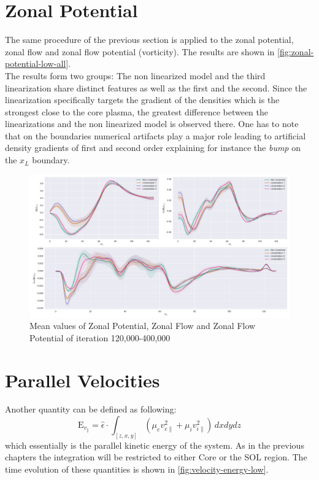 \documentclass[master.tex]{subfiles}
\begin{document}
\section{Zonal Potential}

The same procedure of the previous section is applied to the zonal potential, zonal flow and zonal flow potential (vorticity). The results are shown in \autoref{fig:zonal-potential-low-all}.\\
The results form two groups: The non linearized model and the third linearization share distinct features as well as the first and the second. Since the linearization specifically targets the gradient of the densities which is the strongest close to the core plasma, the greatest difference between the linearizations and the non linearized model is observed there. One has to note that on the boundaries numerical artifacts play a major role leading to artificial density gradients of first and second order explaining for instance the \textit{bump} on the $x_L$ boundary.

\begin{figure}[!htbp]
    \includegraphics[width=\linewidth]{pdfs/zonal_potential_low.pdf}
    \caption{Mean values of Zonal Potential, Zonal Flow and Zonal Flow Potential of iteration 120,000-400,000}
    \label{fig:zonal-potential-low-all}
\end{figure}

\section{Parallel Velocities}

Another quantity can be defined as following:
\begin{equation}
    \mathrm{E}_{v_\parallel} = \hat{\epsilon} \cdot \int_{[z,x,y]} \left( \mu_ev_{e\parallel}^2 + \mu_iv_{i\parallel }^2 \right) \, dxdydz
\end{equation}
which essentially is the parallel kinetic energy of the system.
As in the previous chapters the integration will be restricted to either Core or the \ac{SOL} region. The time evolution of these quantities is shown in \autoref{fig:velocity-energy-low}.
\end{document}
